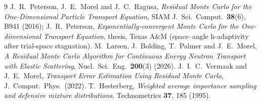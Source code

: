 \documentclass[11pt]{article}
\begin{document}
\begin{thebibliography}{9}
 J.~R.~Peterson, J.~E.~Morel and J.~C.~Ragusa, \emph{Residual Monte
  Carlo for the One-Dimensional Particle Transport Equation}, SIAM J.\ Sci.\ Comput.\
  \textbf{38}(6), B941 (2016); J.~R.~Peterson, \emph{Exponentially-convergent Monte Carlo
  for the One-dimensional Transport Equation}, thesis, Texas A\&M
  (space--angle h-adaptivity after trial-space stagnation).
 M.~Larsen, J.~Bolding, T.~Palmer and J.~E.~Morel, \emph{A Residual
  Monte Carlo Algorithm for Continuous Energy Neutron Transport with Elastic
  Scattering}, Nucl.\ Sci.\ Eng.\ \textbf{200}(3) (2026).
 J.~I.~C.~Vermaak and J.~E.~Morel, \emph{Transport Error Estimation
  Using Residual Monte Carlo}, J.\ Comput.\ Phys.\ (2022).
 T.~Hesterberg, \emph{Weighted average importance sampling and
  defensive mixture distributions}, Technometrics \textbf{37}, 185 (1995).
\end{thebibliography}
\end{document}
